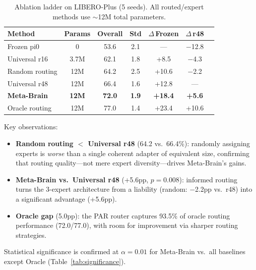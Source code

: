 \documentclass[10pt,twocolumn]{article}
\begin{document}
\begin{table}[h]
\centering
\caption{Ablation ladder on LIBERO-Plus (5 seeds). All routed/expert methods use ${\sim}$12M total parameters.}
\label{tab:ablation_ladder}
\small
\begin{tabular}{lcccccc}
\toprule
Method & Params & Overall & Std & $\Delta$\,Frozen & $\Delta$\,r48 \\
\midrule
Frozen pi0 & 0 & 53.6 & 2.1 & --- & $-$12.8 \\
Universal r16 & 3.7M & 62.1 & 1.8 & +8.5 & $-$4.3 \\
Random routing & 12M & 64.2 & 2.5 & +10.6 & $-$2.2 \\
Universal r48 & 12M & 66.4 & 1.6 & +12.8 & --- \\
\textbf{Meta-Brain} & \textbf{12M} & \textbf{72.0} & \textbf{1.9} & \textbf{+18.4} & \textbf{+5.6} \\
Oracle routing & 12M & 77.0 & 1.4 & +23.4 & +10.6 \\
\bottomrule
\end{tabular}
\end{table}

Key observations:
\begin{itemize}
    \item \textbf{Random routing $<$ Universal r48} (64.2 vs.\ 66.4\%): randomly assigning experts is \emph{worse} than a single coherent adapter of equivalent size, confirming that routing quality---not mere expert diversity---drives Meta-Brain's gains.
    \item \textbf{Meta-Brain vs.\ Universal r48} (+5.6pp, $p{=}0.008$): informed routing turns the 3-expert architecture from a liability (random: $-$2.2pp vs.\ r48) into a significant advantage (+5.6pp).
    \item \textbf{Oracle gap} (5.0pp): the PAR router captures 93.5\% of oracle routing performance (72.0/77.0), with room for improvement via sharper routing strategies.
\end{itemize}

Statistical significance is confirmed at $\alpha{=}0.01$ for Meta-Brain vs.\ all baselines except Oracle (Table~\ref{tab:significance}).
\end{document}
